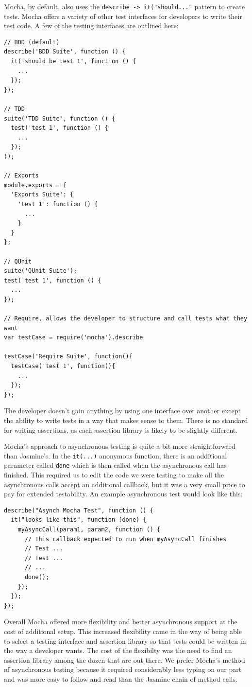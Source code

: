 \documentclass[12pt]{ucthesis}
\begin{document}
Mocha, by default, also uses the \lstinline{describe -> it("should..."} pattern to create tests. Mocha offers a variety of other test interfaces for developers to write their test code. A few of the testing interfaces are outlined here:
\begin{lstlisting}
// BDD (default)
describe('BDD Suite', function () {
  it('should be test 1', function () {
    ...
  });
});

// TDD
suite('TDD Suite', function () {
  test('test 1', function () {
    ...
  });
));

// Exports
module.exports = {
  'Exports Suite': {
    'test 1': function () {
      ...
    }
  }
};

// QUnit
suite('QUnit Suite');
test('test 1', function () {
  ...
});

// Require, allows the developer to structure and call tests what they want
var testCase = require('mocha').describe

testCase('Require Suite', function(){
  testCase('test 1', function(){
    ...
  });
});
\end{lstlisting}
The developer doesn't gain anything by using one interface over another except the ability to write tests in a way that makes sense to them. There is no standard for writing assertions, as each assertion library is likely to be slightly different.

Mocha's approach to asynchronous testing is quite a bit more straightforward than Jasmine's. In the \lstinline{it(...)} anonymous function, there is an additional parameter called \lstinline{done} which is then called when the asynchronous call has finished. This required us to edit the code we were testing to make all the asynchronous calls accept an additional callback, but it was a very small price to pay for extended testability. An example asynchronous test would look like this:
\begin{lstlisting}
describe("Asynch Mocha Test", function () {
  it("looks like this", function (done) {
    myAsyncCall(param1, param2, function () { 
      // This callback expected to run when myAsyncCall finishes
      // Test ...
      // Test ...
      // ...
      done();
    });
  });
});
\end{lstlisting}

Overall Mocha offered more flexibility and better asynchronous support at the cost of additional setup. This increased flexibility came in the way of being able to select a testing interface and assertion library so that tests could be written in the way a developer wants. The cost of the flexibilty was the need to find an assertion library among the dozen that are out there. We prefer Mocha's method of asynchronous testing because it required considerably less typing on our part and was more easy to follow and read than the Jasmine chain of method calls.
\end{document}
